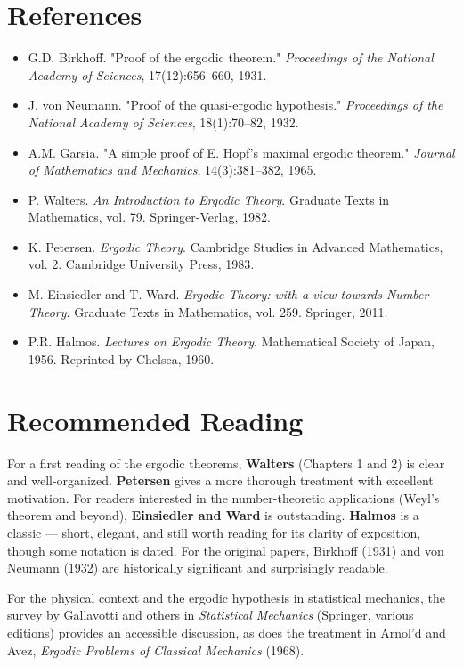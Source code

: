 \section*{References}

\begin{itemize}[nosep]
  \item G.D. Birkhoff. "Proof of the ergodic theorem." \textit{Proceedings of the National Academy of Sciences}, 17(12):656--660, 1931.

  \item J. von Neumann. "Proof of the quasi-ergodic hypothesis." \textit{Proceedings of the National Academy of Sciences}, 18(1):70--82, 1932.

  \item A.M. Garsia. "A simple proof of E. Hopf's maximal ergodic theorem." \textit{Journal of Mathematics and Mechanics}, 14(3):381--382, 1965.

  \item P. Walters. \textit{An Introduction to Ergodic Theory}. Graduate Texts in Mathematics, vol. 79. Springer-Verlag, 1982.

  \item K. Petersen. \textit{Ergodic Theory}. Cambridge Studies in Advanced Mathematics, vol. 2. Cambridge University Press, 1983.

  \item M. Einsiedler and T. Ward. \textit{Ergodic Theory: with a view towards Number Theory}. Graduate Texts in Mathematics, vol. 259. Springer, 2011.

  \item P.R. Halmos. \textit{Lectures on Ergodic Theory}. Mathematical Society of Japan, 1956. Reprinted by Chelsea, 1960.
\end{itemize}


\section*{Recommended Reading}

For a first reading of the ergodic theorems, \textbf{Walters} (Chapters 1 and 2) is clear and well-organized. \textbf{Petersen} gives a more thorough treatment with excellent motivation. For readers interested in the number-theoretic applications (Weyl's theorem and beyond), \textbf{Einsiedler and Ward} is outstanding. \textbf{Halmos} is a classic --- short, elegant, and still worth reading for its clarity of exposition, though some notation is dated. For the original papers, Birkhoff (1931) and von Neumann (1932) are historically significant and surprisingly readable.

For the physical context and the ergodic hypothesis in statistical mechanics, the survey by Gallavotti and others in \textit{Statistical Mechanics} (Springer, various editions) provides an accessible discussion, as does the treatment in Arnol'd and Avez, \textit{Ergodic Problems of Classical Mechanics} (1968).
